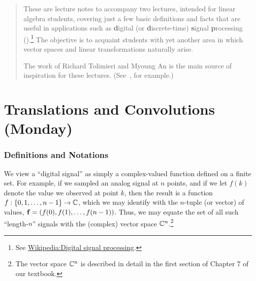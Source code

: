 \starON

\begin{abstract}
These are lecture notes to accompany two lectures, intended for linear algebra
students, covering just a few basic definitions and
facts that are useful in applications such as {\bf d}igital 
(or {\bf d}iscrete-time) {\bf s}ignal {\bf p}rocessing 
(\dsp).\footnote{See 
  \href{https://en.wikipedia.org/wiki/Digital_signal_processing}{Wikipedia:Digital
    signal processing}.
}
The objective is to acquaint students with yet another area
in which vector spaces and linear transformations naturally arise.

The work of Richard Tolimieri and Myoung An is the main source of inspiration
for these lectures. (See~\cite{MR2159216}, for example.) 



\end{abstract}

\part{Translations and Convolutions (Monday)}

\section{Definitions and Notations}


We view a ``digital signal'' as simply a complex-valued function
defined on a finite set.  For example, if we sampled an analog signal at $n$
points, and if we let $f(k)$ denote the value  
we observed at point $k$, then the result is a function 
$f: \{0,1,\dots, n-1\} \to \mathbb C$, which we may identify with the $n$-tuple 
(or vector) of values, $\mathbf{f} = (f(0), f(1), \dots, f(n-1))$.  Thus, we may equate
the set of all such ``length-$n$'' signals with the (complex) vector space
$\mathbb C^n$.\footnote{The vector space $\mathbb C^n$ is described in detail in the first
  section of Chapter 7 of our textbook.}

